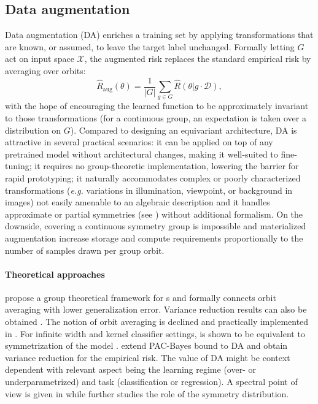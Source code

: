 \documentclass[mathematics,review,submit,moreauthors]{Definitions/mdpi}
\begin{document}
\subsection{Data augmentation}
Data augmentation (DA) enriches a training set by applying transformations that are known, or assumed, to leave the target label unchanged.
Formally letting $G$ act on input space $\mathcal X$, the augmented risk replaces the standard empirical risk by averaging over orbits:
$$
\hat R_{\text{aug}}(\theta)=\frac{1}{|G|}\sum_{g\in G}\hat R(\theta |g\cdot \mathcal D),
$$
with the hope of encouraging the learned function to be approximately invariant to those transformations (for a continuous group, an expectation is taken over a distribution on $G$).
Compared to designing an equivariant architecture, DA is attractive in several practical scenarios: it can be applied on top of any pretrained model without architectural changes, making it well-suited to fine-tuning; it requires no group-theoretic implementation, lowering the barrier for rapid prototyping; it naturally accommodates complex or poorly characterized transformations (\textit{e.g.} variations in illumination, viewpoint, or background in images) not easily amenable to an algebraic description and it handles approximate or partial symmetries (see ) without additional formalism.
On the downside, covering a continuous symmetry group is impossible and materialized augmentation increase storage and compute requirements proportionally to the number of samples drawn per group orbit.

\paragraph{Theoretical approaches}
\citet{chen2020} propose a group theoretical framework for s and formally connects orbit averaging with lower generalization error.
Variance reduction results can also be obtained \citep{chen2020,dao2019p3icml}.
The notion of orbit averaging is declined and practically implemented in \citet{benton2020anips}.
For infinite width and kernel classifier settings,  is shown to be equivalent to symmetrization of the model \citep{maass2024,dao2019p3icml}.
\citet{lyle2020} extend PAC-Bayes bound to DA and obtain variance reduction for the empirical risk.
The value of DA might be context dependent with relevant aspect being the learning regime (over- or underparametrized) and task (classification or regression).
A spectral point of view is given in \citet{lin2024} while \citet{lawrence2026} further studies the role of the symmetry distribution.
\end{document}
